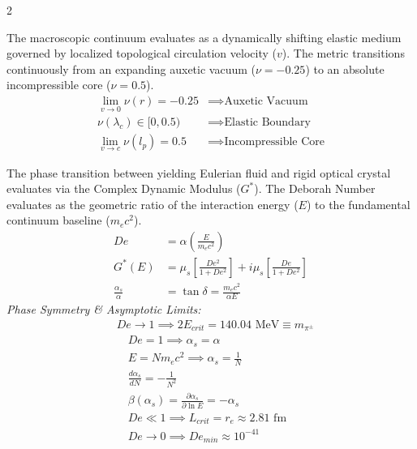 \documentclass[11pt, a4paper]{article}
\newcounter{cheatnum}
\begin{document}
\begin{multicols}{2}
\begin{tcolorbox}[cheatbox, title={\refstepcounter{cheatnum}\label{box:rheological_gradient}\thecheatnum. The Continuous Rheological Gradient \scriptsize\hfill\hyperref[sec:deriv_rheological_gradient]{[Proof $\downarrow$]}}]
The macroscopic continuum evaluates as a dynamically shifting elastic medium governed by localized topological circulation velocity ($v$). The metric transitions continuously from an expanding auxetic vacuum ($\nu = -0.25$) to an absolute incompressible core ($\nu = 0.5$).
\begin{align}
    \lim_{v \to 0} \nu(r) = -0.25 &\implies \text{Auxetic Vacuum} \label{eq:poisson_macro} \\
    \nu(\lambda_c) \in [0, 0.5) &\implies \text{Elastic Boundary} \label{eq:poisson_compton} \\
    \lim_{v \to c} \nu(l_p) = 0.5 &\implies \text{Incompressible Core} \label{eq:poisson_local}
\end{align}
\end{tcolorbox}

\begin{tcolorbox}[cheatbox, title={\refstepcounter{cheatnum}\label{box:unified_deborah}\thecheatnum. The Unified Cosmological Deborah Number \scriptsize\hfill\hyperref[sec:deriv_unified_deborah]{[Proof $\downarrow$]}}]
The phase transition between yielding Eulerian fluid and rigid optical crystal evaluates via the Complex Dynamic Modulus ($G^*$). The Deborah Number evaluates as the geometric ratio of the interaction energy ($E$) to the fundamental continuum baseline ($m_e c^2$). 
\begin{align}
    De &= \alpha \left( \frac{E}{m_e c^2} \right) \label{eq:unified_deborah} \\
    G^*(E) &= \mu_s \left[ \frac{De^2}{1 + De^2} \right] + i \mu_s \left[ \frac{De}{1 + De^2} \right] \label{eq:deborah_modulus} \\
    \frac{\alpha_s}{\alpha} &= \tan \delta = \frac{m_e c^2}{\alpha E} \label{eq:angular_distribution}
\end{align}
\textit{Phase Symmetry \& Asymptotic Limits:}
\begin{align}
    &De \to 1 \implies 2 E_{crit} = 140.04 \text{ MeV} \equiv m_{\pi^{\pm}} \label{eq:de_glass} \\
    &\quad De = 1 \implies \alpha_s = \alpha \label{eq:electro_strong_symmetry} \\
    &\quad E = N m_e c^2 \implies \alpha_s = \frac{1}{N} \label{eq:volumetric_multiplier} \\
    &\quad \frac{d\alpha_s}{dN} = - \frac{1}{N^2} \label{eq:beta_state} \\
    &\quad \beta(\alpha_s) = \frac{\partial \alpha_s}{\partial \ln E} = - \alpha_s \label{eq:beta_function} \\
    &\quad De \ll 1 \implies L_{crit} = r_e \approx 2.81 \text{ fm} \label{eq:de_range} \\
    &\quad De \to 0 \implies De_{min} \approx 10^{-41} \label{eq:de_gravity}
\end{align}
\end{tcolorbox}


\end{multicols}
\end{document}
